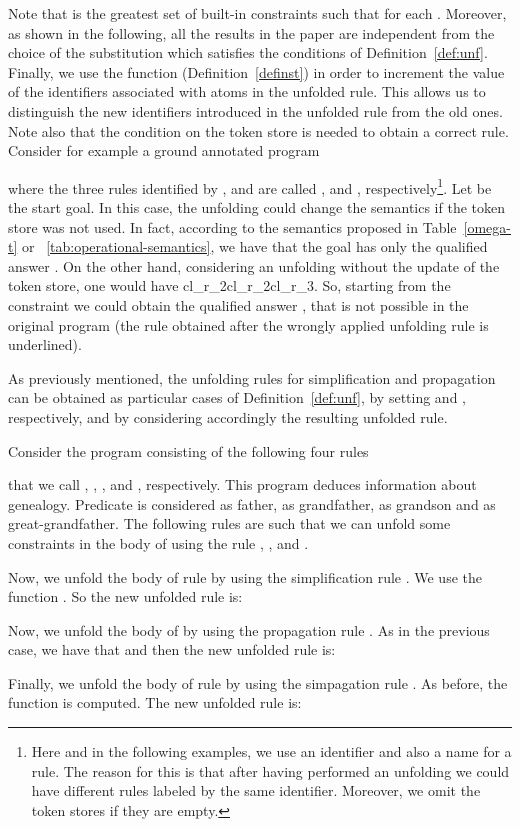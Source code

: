 \documentclass{tlp}
\begin{document}
Note that   is the greatest set of built-in constraints such that  for each . Moreover,  as shown in the following, all the results in the paper are independent from the choice of the substitution  which satisfies the conditions of Definition~\ref{def:unf}. Finally, we use  the function   (Definition~\ref{definst})
in order to increment the value of the
identifiers associated with atoms in the unfolded rule. This allows
us to distinguish the new identifiers introduced in the unfolded
rule from the old ones. Note also that the condition on the token
store is needed to obtain a correct rule.  Consider for example a ground annotated
program

where
the three rules identified by , and  are called , and , respectively\footnote{Here and in the following examples, we use an identifier and also a name for a rule. The reason for this is that after having performed an unfolding we could have different rules labeled by the same identifier. Moreover, we omit the token stores if they are empty.}. Let
 be  the start goal. In this case, the unfolding could change
the semantics if the token store was not used. In fact, according
to the semantics proposed in Table~\ref{omega-t} or
~\ref{tab:operational-semantics}, we have that the goal  has only the qualified answer
.
 On the other hand,  considering an
unfolding without the update of  the token store, one would have
cl_{r_2}cl_{r_2}cl_{r_3}.
So, starting from the constraint  we could obtain the qualified answer , that
is not possible in the original program (the rule obtained after
the wrongly applied unfolding rule is underlined).



As previously mentioned, the unfolding rules for simplification
and propagation can be obtained as particular cases of
Definition~\ref{def:unf}, by setting  and  , respectively, and by considering accordingly the
resulting unfolded rule.



\begin{example}\label{ex:gen_adam}
Consider the program  consisting of the following four rules

that we call , , , and , respectively. This program
deduces information  about genealogy. Predicate  is considered as
father,  as grandfather,  as grandson and  as
great-grandfather. The following rules are such that we can unfold
some constraints in the body of  using the rule ,  , and .

Now, we  unfold the body of rule  by using the simplification rule
. We use the  function
.
So the new unfolded rule is:



Now, we unfold the body of  by using the propagation rule .
As in the previous case, we have that  and then
the new unfolded rule is:


Finally, we unfold the body of rule  by using the simpagation
rule . As before, the function
 is computed.
The new unfolded rule is:




\end{example}
\end{document}
